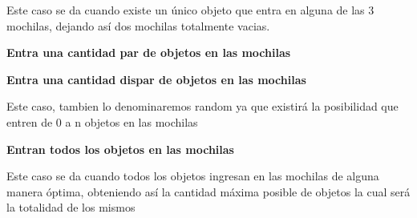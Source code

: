 Este caso se da cuando existe un \'unico objeto que entra en alguna de las 3 mochilas, dejando as\'i dos mochilas totalmente vacias.

\begin{center}
 \textbf{Entra una cantidad par de objetos en las mochilas}
\end{center}

\begin{center}
 \textbf{Entra una cantidad dispar de objetos en las mochilas}
\end{center}

Este caso, tambien lo denominaremos random ya que existir\'a la posibilidad que entren de 0 a n objetos en las mochilas

\begin{center}
 \textbf{Entran todos los objetos en las mochilas}
\end{center}

Este caso se da cuando todos los objetos ingresan en las mochilas de alguna manera \'optima, obteniendo as\'i la cantidad m\'axima posible de objetos la cual ser\'a la totalidad de los mismos

